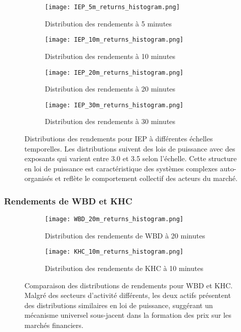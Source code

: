 \documentclass[12pt,a4paper]{article}
\theoremstyle{definition}
\theoremstyle{remark}
\begin{document}
\begin{figure}[H]
    \centering
    \begin{subfigure}[b]{0.45\textwidth}
        \texttt{[image: IEP\_5m\_returns\_histogram.png]}
        \caption{Distribution des rendements à 5 minutes}
        \label{fig:IEP_5m_moved}
    \end{subfigure}
    \hfill
    \begin{subfigure}[b]{0.45\textwidth}
        \texttt{[image: IEP\_10m\_returns\_histogram.png]}
        \caption{Distribution des rendements à 10 minutes}
        \label{fig:IEP_10m_moved}
    \end{subfigure}
    
    \vspace{0.5cm}
    
    \begin{subfigure}[b]{0.45\textwidth}
        \texttt{[image: IEP\_20m\_returns\_histogram.png]}
        \caption{Distribution des rendements à 20 minutes}
        \label{fig:IEP_20m_moved}
    \end{subfigure}
    \hfill
    \begin{subfigure}[b]{0.45\textwidth}
        \texttt{[image: IEP\_30m\_returns\_histogram.png]}
        \caption{Distribution des rendements à 30 minutes}
        \label{fig:IEP_30m_moved}
    \end{subfigure}
    \caption{Distributions des rendements pour IEP à différentes échelles temporelles. Les distributions suivent des lois de puissance avec des exposants qui varient entre 3.0 et 3.5 selon l'échelle. Cette structure en loi de puissance est caractéristique des systèmes complexes auto-organisés et reflète le comportement collectif des acteurs du marché.}
    \label{fig:IEP_multi_scale_moved}
\end{figure}

\subsubsection{Rendements de WBD et KHC}

\begin{figure}[H]
    \centering
    \begin{subfigure}[b]{0.45\textwidth}
        \texttt{[image: WBD\_20m\_returns\_histogram.png]}
        \caption{Distribution des rendements de WBD à 20 minutes}
        \label{fig:WBD_20m_moved}
    \end{subfigure}
    \hfill
    \begin{subfigure}[b]{0.45\textwidth}
        \texttt{[image: KHC\_10m\_returns\_histogram.png]}
        \caption{Distribution des rendements de KHC à 10 minutes}
        \label{fig:KHC_10m_moved}
    \end{subfigure}
    \caption{Comparaison des distributions de rendements pour WBD et KHC. Malgré des secteurs d'activité différents, les deux actifs présentent des distributions similaires en loi de puissance, suggérant un mécanisme universel sous-jacent dans la formation des prix sur les marchés financiers.}
    \label{fig:WBD_KHC_returns_moved}
\end{figure}
\end{document}
